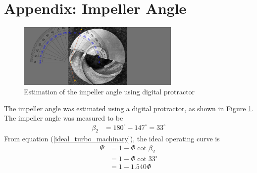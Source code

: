 \section{Appendix: Impeller Angle}
\label{sec:impeller_angle}
\begin{figure}[h]
    \centering
    \includegraphics[width=0.7\textwidth]{Sections/Figures/Impeller Angle.jpg}
    \caption{Estimation of the impeller angle using digital protractor}
    \label{fig:impeller_angle}
\end{figure}
The impeller angle was estimated using a digital protractor, as shown in Figure \ref{fig:impeller_angle}. The impeller angle was measured to be 
\begin{align*}
    \beta_2 &= 180^\circ - 147^\circ = 33^\circ
\end{align*}
From equation (\ref{ideal_turbo_machinary}), the ideal operating curve is
\begin{align*}
    \Psi &= 1 - \Phi \cot{\beta_2} \\
    &= 1 - \Phi \cot{33^\circ} \\
    &= 1 - 1.540 \Phi
\end{align*}